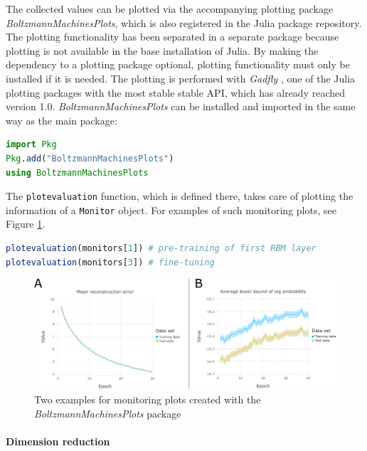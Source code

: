 \documentclass[12pt]{article}
\newcommand{\inlinecode}[1]{\texttt{#1}}
\newcommand{\apkg}[1]{\emph{#1}}
\begin{document}
The collected values can be plotted via the accompanying plotting package \apkg{Boltzmann\-Machines\-Plots}, which is also registered in the Julia package repository.
The plotting functionality has been separated in a separate package because plotting is not available in the base installation of Julia.
By making the dependency to a plotting package optional, plotting functionality must only be installed if it is needed.
The plotting is performed with \apkg{Gadfly} \citep{gadfly}, one of the Julia plotting packages with the most stable stable API, which has already reached version 1.0.
\apkg{BoltzmannMachinesPlots} can be installed and imported in the same way as the main package:

\begin{lstlisting}[language=Julia]
import Pkg
Pkg.add("BoltzmannMachinesPlots")
using BoltzmannMachinesPlots
\end{lstlisting}

The \inlinecode{plotevaluation} function, which is defined there, takes care of plotting the information of a \inlinecode{Monitor} object.
For examples of such monitoring plots, see Figure \ref{fig:monitoring_bmplots}.
\begin{lstlisting}[language=Julia]
plotevaluation(monitors[1]) # pre-training of first RBM layer
plotevaluation(monitors[3]) # fine-tuning
\end{lstlisting}


\begin{figure}[h]
   \centering
   \includegraphics[scale=.59]{images/bmplots_curves.pdf}
   \caption{Two examples for monitoring plots created with the \apkg{BoltzmannMachinesPlots} package}
\label{fig:monitoring_bmplots}
\end{figure}


\paragraph{Dimension reduction}
\end{document}
